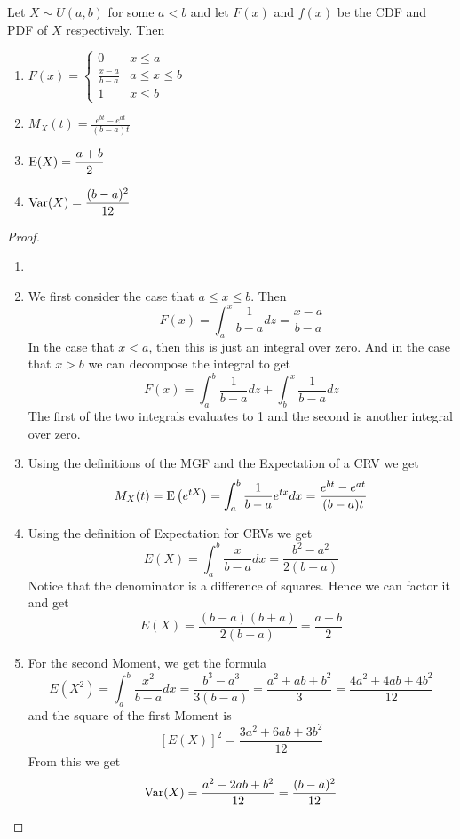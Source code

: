 \begin{theorem}
    Let $X\sim U(a,b)$ for some $a<b$ and let $F(x)$ and $f(x)$ be the CDF and PDF of $X$ respectively. Then
    \begin{enumerate}
        \item $F(x) = \begin{cases}
            0 & x \le a\\
            \displaystyle\frac{x-a}{b-a} & a\le x \le b\\
            1 & x \le b
        \end{cases}$
        \item $M_X(t)=\displaystyle\frac{e^{bt}-e^{at}}{(b-a)t}$
        \item $\textup{E}(X)=\displaystyle\frac{a+b} 2$
        \item $\textup{Var}(X)=\displaystyle\frac{(b-a)^2}{12}$
    \end{enumerate}
    \begin{proof}
        \begin{enumerate}
            \item[]
            \item We first consider the case that $a\le x\le b$. Then
            \[
                F(x)=\int_a^x \frac 1 {b-a} dz = \frac{x-a}{b-a}
            \]
            In the case that $x<a$, then this is just an integral over zero. And in the case that $x>b$ we can decompose the integral to get
            \[
                F(x)=\int_a^b \frac 1 {b-a} dz + \int_b^x \frac 1 {b-a} dz
            \]
            The first of the two integrals evaluates to 1 and the second is another integral over zero.
            \item Using the definitions of the MGF and the Expectation of a CRV we get
            \[
                M_X(t)=\textup{E}\left(e^{tX}\right)=\int_a^b \frac 1 {b-a} e^{tx} dx=\frac{e^{bt}-e^{at}}{(b-a)t}
            \]
            \item Using the definition of Expectation for CRVs we get
            \[
                E(X)=\int_a^b \frac x {b-a} dx=\frac{b^2-a^2}{2(b-a)}
            \]
            Notice that the denominator is a difference of squares. Hence we can factor it and get
            \[
                E(X)=\frac{(b-a)(b+a)}{2(b-a)}=\frac{a+b} 2
            \]
            \item For the second Moment, we get the formula
            \[
                E(X^2)=\int_a^b \frac {x^2} {b-a} dx=\frac{b^3-a^3}{3(b-a)}=\frac{a^2+ab+b^2} 3 = \frac{4a^2+4ab+4b^2}{12}
            \]
            and the square of the first Moment is 
            \[
                [E(X)]^2 = \frac{3a^2+6ab+3b^2}{12}
            \]
            From this we get
            \[
                \textup{Var}(X)=\frac{a^2-2ab+b^2} {12}= \frac{(b-a)^2} {12}
            \]
        \end{enumerate}
    \end{proof}
\end{theorem}

